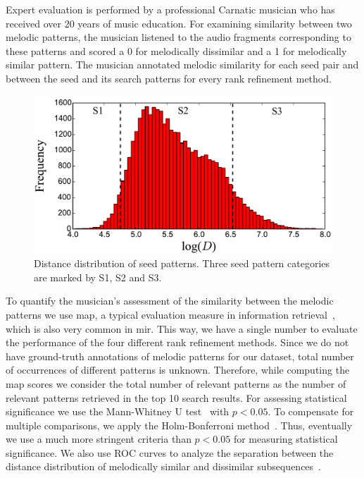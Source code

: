 Expert evaluation is performed by a professional Carnatic musician who has received over 20 years of music education. For examining similarity between two melodic patterns, the musician listened to the audio fragments corresponding to these patterns and scored a 0 for melodically dissimilar and a 1 for melodically similar pattern. The musician annotated melodic similarity for each seed pair and between the seed and its search patterns for every rank refinement method.


\begin{figure}
	\begin{center}
		\includegraphics[width=\figSizeEightyFive]{ch06_patterns/figures/discovery/SeedDistribution.pdf}
	\end{center}
	\caption{Distance distribution of seed patterns. Three seed pattern categories are marked by S1, S2 and S3.}
	\label{fig:SeedPatternsDistanceDistribution}
\end{figure}


To quantify the musician's assessment of the similarity between the melodic patterns  we use \gls{map}, a typical evaluation measure in information retrieval~\citep{manning2008introduction}, which is also very common in \gls{mir}. This way, we have a single number to evaluate the performance of the four different rank refinement methods. Since we do not have ground-truth annotations of melodic patterns for our dataset, total number of occurrences of different patterns is unknown. Therefore, while computing the \gls{map} scores we consider the total number of relevant patterns as the number of relevant patterns retrieved in the top 10 search results.  For assessing statistical significance we use the Mann-Whitney U test~\citep{mann1947test} with $p < 0.05$. To compensate for multiple comparisons, we apply the Holm-Bonferroni method~\citep{holm1979simple}. Thus, eventually we use a much more stringent criteria than $p < 0.05$ for measuring statistical significance. We also use ROC curves to analyze the separation between the distance distribution of melodically similar and dissimilar subsequences~\citep{manning2008introduction}. 


